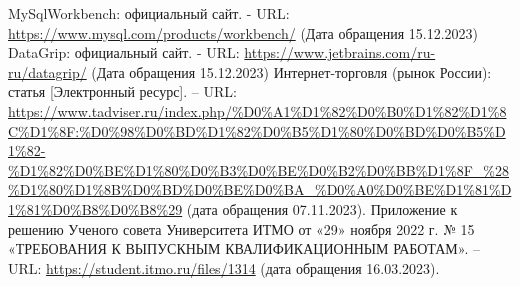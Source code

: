 \documentclass[14pt]{extreport}
\begin{document}
\begin{thebibliography}{10}
     MySqlWorkbench: официальный сайт. - URL: \url{https://www.mysql.com/products/workbench/} (Дата обращения 15.12.2023)
     DataGrip: официальный сайт. - URL: \url{https://www.jetbrains.com/ru-ru/datagrip/} (Дата обращения 15.12.2023)
     Интернет-торговля (рынок России): статья [Электронный ресурс]. – URL: \url{https://www.tadviser.ru/index.php/%D0%A1%D1%82%D0%B0%D1%82%D1%8C%D1%8F:%D0%98%D0%BD%D1%82%D0%B5%D1%80%D0%BD%D0%B5%D1%82-%D1%82%D0%BE%D1%80%D0%B3%D0%BE%D0%B2%D0%BB%D1%8F_%28%D1%80%D1%8B%D0%BD%D0%BE%D0%BA_%D0%A0%D0%BE%D1%81%D1%81%D0%B8%D0%B8%29} (дата обращения 07.11.2023).
     Приложение к решению Ученого совета Университета ИТМО от «29» ноября 2022 г. № 15 «ТРЕБОВАНИЯ К ВЫПУСКНЫМ КВАЛИФИКАЦИОННЫМ РАБОТАМ». – URL: \url{https://student.itmo.ru/files/1314} (дата обращения 16.03.2023).

\end{thebibliography}
\end{document}
